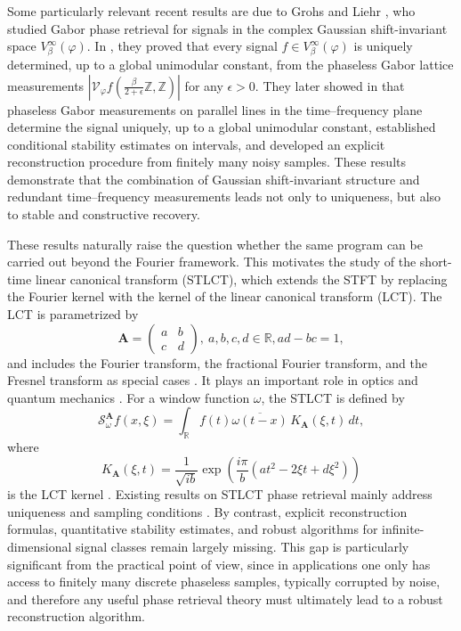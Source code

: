 \documentclass[11pt, reqno]{amsart}
\newcommand{\Z}{\mathbb{Z}}
\newcommand{\R}{\mathbb{R}}
\numberwithin{equation}{section}
\begin{document}
Some particularly relevant recent results are due to Grohs and Liehr \cite{grohs2023injectivity,grohs2024stable}, who studied Gabor phase retrieval for signals in the complex Gaussian shift-invariant space $V_\beta^\infty(\varphi)$. In \cite{grohs2023injectivity}, they proved that every signal $f\in V_\beta^\infty(\varphi)$ is uniquely determined, up to a global unimodular constant,  from the phaseless Gabor lattice measurements $|\mathcal{V}_{\varphi} f(\frac{\beta}{2+\epsilon}\Z, \Z)|$ for any $\epsilon > 0$. 
They later showed in \cite{grohs2024stable} that phaseless Gabor measurements on parallel lines in the time--frequency plane determine the signal uniquely, up to a global unimodular constant, established conditional stability estimates on intervals, and developed an explicit reconstruction procedure from finitely many noisy samples. These results demonstrate that the combination of Gaussian shift-invariant structure and redundant time--frequency measurements leads not only to uniqueness, but also to stable and constructive recovery.

These results naturally raise the question whether the same program can be carried out beyond the Fourier framework. This motivates the study of the short-time linear canonical transform (STLCT), which extends the STFT by replacing the Fourier kernel with the kernel of the linear canonical transform (LCT). The LCT is parametrized by
$$ \mathbf A=
\begin{pmatrix}
a & b\\
c & d
\end{pmatrix}, \ a,b,c,d\in \R,  ad-bc=1,$$
and includes the Fourier transform, the fractional Fourier transform, and the Fresnel transform as special cases \cite{healy2016linear,xu2013linear}. It plays an important role in optics \cite{healy2016linear,stern2008uncertainty} and quantum mechanics \cite{moshinsky1971linear}. For a window function $\omega$, the STLCT is defined by
$$\mathcal S_\omega^{\mathbf A}f(x,\xi) = \int_{\mathbb R} f(t)\overline{\omega(t-x)}\,K_{\mathbf A}(\xi,t)\,dt, $$
where
$$ K_{\mathbf A}(\xi,t) =\frac{1}{\sqrt{ib}}\exp\!\left(\frac{i\pi}{b}(at^2-2\xi t+d\xi^2)\right)$$
is the LCT kernel \cite{kou2012windowed,xu2013linear}.  Existing results on STLCT phase retrieval mainly address uniqueness and sampling conditions \cite{dong2025uniqueness,li2024uniqueness,li2025uniqueness,liu2026uniqueness}. By contrast, explicit reconstruction formulas, quantitative stability estimates, and robust algorithms for infinite-dimensional signal classes remain largely missing. This gap is particularly significant from the practical point of view, since in applications one only has access to finitely many discrete phaseless samples, typically corrupted by noise, and therefore any useful phase retrieval theory must ultimately lead to a robust reconstruction algorithm.
\end{document}
